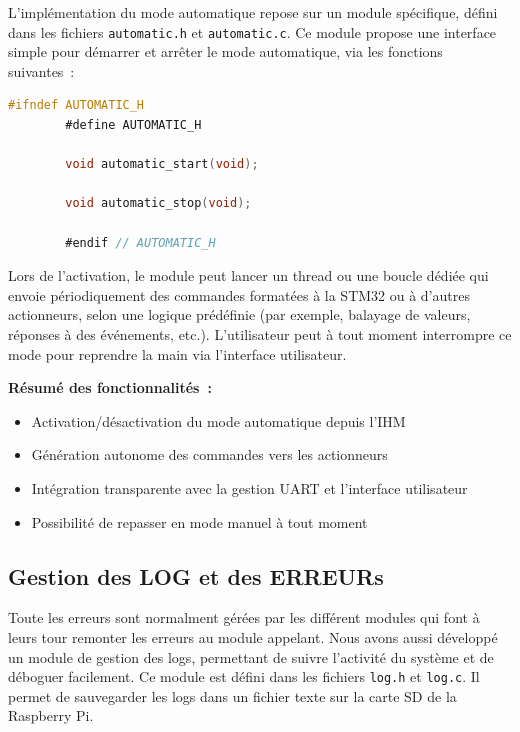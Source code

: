     L'implémentation du mode automatique repose sur un module spécifique, défini dans les fichiers \texttt{automatic.h} et \texttt{automatic.c}. Ce module propose une interface simple pour démarrer et arrêter le mode automatique, via les fonctions suivantes~:

    \begin{lstlisting}[language=C, caption={Interface du module automatique}, label={lst:automaticheader}]
        #ifndef AUTOMATIC_H
        #define AUTOMATIC_H

        void automatic_start(void);

        void automatic_stop(void);

        #endif // AUTOMATIC_H
    \end{lstlisting}

    Lors de l'activation, le module peut lancer un thread ou une boucle dédiée qui envoie périodiquement des commandes formatées à la STM32 ou à d'autres actionneurs, selon une logique prédéfinie (par exemple, balayage de valeurs, réponses à des événements, etc.). L'utilisateur peut à tout moment interrompre ce mode pour reprendre la main via l'interface utilisateur.

    \vspace{0.5em}
    \noindent
    \textbf{Résumé des fonctionnalités~:}
    \begin{itemize}
        \item Activation/désactivation du mode automatique depuis l'IHM
        \item Génération autonome des commandes vers les actionneurs
        \item Intégration transparente avec la gestion UART et l'interface utilisateur
        \item Possibilité de repasser en mode manuel à tout moment
    \end{itemize}

\subsection{Gestion des LOG et des ERREURs}
    Toute les erreurs sont normalment gérées par les différent modules qui font à leurs tour remonter les erreurs au module appelant.
    Nous avons aussi développé un module de gestion des logs, permettant de suivre l'activité du système et de déboguer facilement. Ce module est défini dans les fichiers \texttt{log.h} et \texttt{log.c}.
    Il permet de sauvegarder les logs dans un fichier texte sur la carte SD de la Raspberry Pi.
